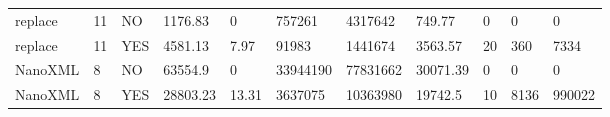\begin{table*}[]
\begin{tabular}{@{}lllllllllll@{}}
        replace                                                  & 11                                                           & NO                                                                 & 1176.83                                                         & 0                                                                        & 757261                                                         & 4317642                                                       & 749.77                                                        & 0                                                                   & 0                                                                   & 0                                                           \\
        replace                                                  & 11                                                           & YES                                                                & 4581.13                                                         & 7.97                                                                     & 91983                                                          & 1441674                                                       & 3563.57                                                       & 20                                                                  & 360                                                                 & 7334                                                        \\ \midrule
        NanoXML                                                  & 8                                                            & NO                                                                 & 63554.9                                                         & 0                                                                        & 33944190                                                       & 77831662                                                      & 30071.39                                                      & 0                                                                   & 0                                                                   & 0                                                           \\
        NanoXML                                                  & 8                                                            & YES                                                                & 28803.23                                                        & 13.31                                                                    & 3637075                                                        & 10363980                                                      & 19742.5                                                       & 10                                                                  & 8136                                                                & 990022                                                      \\ \midrule

\end{tabular}
\end{table*}
